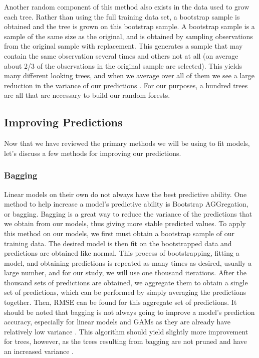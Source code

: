 \documentclass[12pt]{article}\usepackage[]{graphicx}\usepackage[]{color}
\begin{document}
Another random component of this method also exists in the data used to grow each tree. Rather than using the full training data set, a bootstrap sample is obtained and the tree is grown on this bootstrap sample. A bootstrap sample is a sample of the same size as the original, and is obtained by sampling observations from the original sample with replacement. This generates a sample that may contain the same observation several times and others not at all (on average about 2/3 of the observations in the original sample are selected). This yields many different looking trees, and when we average over all of them we see a large reduction in the variance of our predictions \cite{gam}. For our purposes, a hundred trees are all that are necessary to build our random forests.

\subsection{Improving Predictions}
Now that we have reviewed the primary methods we will be using to fit models, let's discuss a few methods for improving our predictions.

\subsubsection{Bagging}
Linear models on their own do not always have the best predictive ability. One method to help increase a model's predictive ability is Bootstrap AGGregation, or bagging. Bagging is a great way to reduce the variance of the predictions that we obtain from our models, thus giving more stable predicted values. To apply this method on our models, we first must obtain a bootstrap sample of our training data. The desired model is then fit on the bootstrapped data and predictions are obtained like normal. This process of bootstrapping, fitting a model, and obtaining predictions is repeated as many times as desired, usually a large number, and for our study, we will use one thousand iterations. After the thousand sets of predictions are obtained, we aggregate them to obtain a single set of predictions, which can be performed by simply averaging the predictions together. Then, RMSE can be found for this aggregate set of predictions. It should be noted that bagging is not always going to improve a model's prediction accuracy, especially for linear models and GAMs as they are already have relatively low variance \cite{bag}. This algorithm should yield slightly more improvement for trees, however, as the trees resulting from bagging are not pruned and have an increased variance \cite{gam}.
\end{document}
